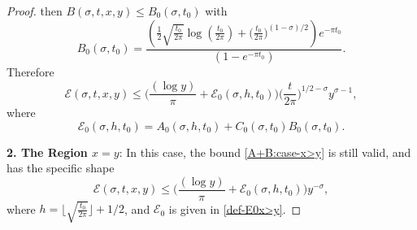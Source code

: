 \documentclass[11pt,letterpaper,oneside,reqno]{amsart}
\renewcommand{\^}[1]{\widehat{#1}}
\newcommand{\s}{\sigma}
\numberwithin{equation}{section}
\theoremstyle{remark}
\begin{document}
\begin{proof}
then $B(\sigma,t,x,y) \leq B_0(\sigma,t_0) $ with
\begin{equation}
\label{def-B0}
B_0(\sigma,t_0) = \frac{\left(\frac{1}{2} \sqrt{\frac{t_0}{2\pi}} \log\left(\frac{t_0}{2\pi}\right) + \big(\frac{t_0}{2\pi}\big)^{(1-\sigma)/2}\right)  e^{- \pi t_0}}{(1 - e^{-\pi t_0}) }.
\end{equation}
Therefore 
  \begin{equation}\label{A+B:case-x>y}
  \mathcal{E}(\sigma,t,x,y) %
  \leq \Big( \frac{(\log y)}{\pi} 
  + \mathcal{E}_0(\sigma,h,t_0) \Big) \Big(\frac{t}{2\pi}\Big)^{1/2-\sigma} y^{\sigma-1}  ,
    \end{equation}
where
\begin{equation}\label{def-E0x>y}
    \mathcal{E}_0(\s,h,t_0) = A_0(\s,h,t_0)  + C_0(\s, t_0) B_0(\s,t_0).
\end{equation}
%

\smallskip
\textbf{2. The Region $x = y$}:  
In this case, the bound \eqref{A+B:case-x>y}
is still valid, and has the specific shape 
 \begin{equation}\label{A+B:case-x=y}
 \mathcal{E}(\sigma,t,x,y) \leq \Big( \frac{(\log y)}{\pi} + \mathcal{E}_0\left(\sigma, h, t_0\right)\Big) y^{-\sigma} ,\end{equation}
where $h = \lfloor \sqrt{\frac{t_0}{2\pi}}\rfloor +1/2$, and $\mathcal{E}_0$ is given in \eqref{def-E0x>y}. 
%


\end{proof}
\end{document}

